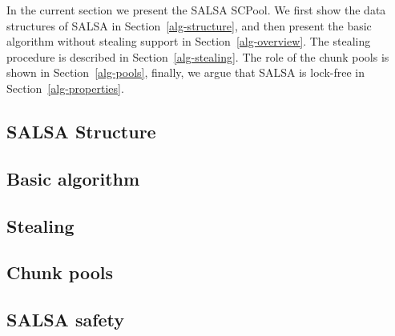 In the current section we present the SALSA SCPool. We first show the data structures of SALSA in Section~\ref{alg-structure}, and then present the basic algorithm without stealing support in Section~\ref{alg-overview}. The stealing procedure is described in Section~\ref{alg-stealing}. The role of the chunk pools is shown in Section~\ref{alg-pools}, finally, we argue that SALSA is lock-free in Section~\ref{alg-properties}. 

\subsection{SALSA Structure\label{alg-structure}}

\subsection{Basic algorithm\label{alg-overview}}

\subsection{Stealing\label{alg-stealing}}

\subsection{Chunk pools\label{alg-pools}}

\subsection{SALSA safety}
